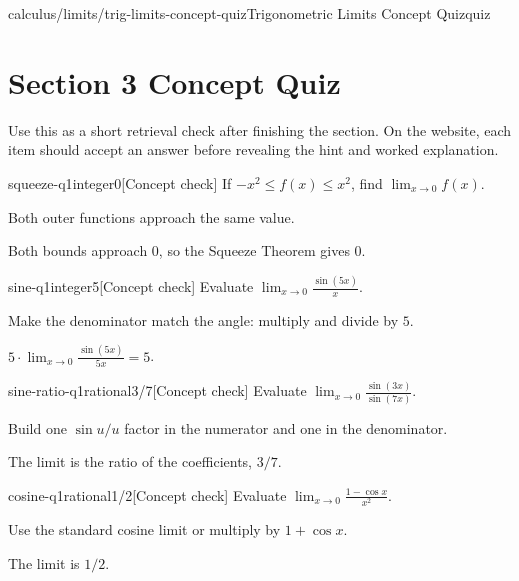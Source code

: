 \documentclass[11pt,openany]{book}
\theoremstyle{bgplain}
\newcounter{bgcheck}[section]
\begin{document}
\begin{webpage}{calculus/limits/trig-limits-concept-quiz}{Trigonometric Limits Concept Quiz}{quiz}
\section*{Section 3 Concept Quiz}

Use this as a short retrieval check after finishing the section. On the website, each item should accept an answer before revealing the hint and worked explanation.

\begin{bgcheck}{squeeze-q1}{integer}{0}[Concept check]
If \(-x^2\le f(x)\le x^2\), find \(\lim_{x\to0}f(x)\).
\begin{bghint}
Both outer functions approach the same value.
\end{bghint}
\begin{bgreveal}
Both bounds approach \(0\), so the Squeeze Theorem gives \(0\).
\end{bgreveal}
\end{bgcheck}

\begin{bgcheck}{sine-q1}{integer}{5}[Concept check]
Evaluate \(\lim_{x\to0}\frac{\sin(5x)}{x}\).
\begin{bghint}
Make the denominator match the angle: multiply and divide by \(5\).
\end{bghint}
\begin{bgreveal}
\(5\cdot\lim_{x\to0}\frac{\sin(5x)}{5x}=5\).
\end{bgreveal}
\end{bgcheck}

\begin{bgcheck}{sine-ratio-q1}{rational}{3/7}[Concept check]
Evaluate \(\lim_{x\to0}\frac{\sin(3x)}{\sin(7x)}\).
\begin{bghint}
Build one \(\sin u/u\) factor in the numerator and one in the denominator.
\end{bghint}
\begin{bgreveal}
The limit is the ratio of the coefficients, \(3/7\).
\end{bgreveal}
\end{bgcheck}

\begin{bgcheck}{cosine-q1}{rational}{1/2}[Concept check]
Evaluate \(\lim_{x\to0}\frac{1-\cos x}{x^2}\).
\begin{bghint}
Use the standard cosine limit or multiply by \(1+\cos x\).
\end{bghint}
\begin{bgreveal}
The limit is \(1/2\).
\end{bgreveal}
\end{bgcheck}


\end{webpage}
\end{document}

